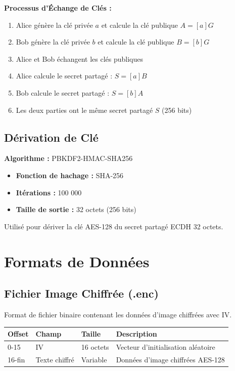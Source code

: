 \documentclass[12pt,a4paper]{report}
\begin{document}
\textbf{Processus d'Échange de Clés :}
\begin{enumerate}
    \item Alice génère la clé privée $a$ et calcule la clé publique $A = [a]G$
    \item Bob génère la clé privée $b$ et calcule la clé publique $B = [b]G$
    \item Alice et Bob échangent les clés publiques
    \item Alice calcule le secret partagé : $S = [a]B$
    \item Bob calcule le secret partagé : $S = [b]A$
    \item Les deux parties ont le même secret partagé $S$ (256 bits)
\end{enumerate}

\subsection{Dérivation de Clé}

\textbf{Algorithme :} PBKDF2-HMAC-SHA256

\begin{itemize}
    \item \textbf{Fonction de hachage :} SHA-256
    \item \textbf{Itérations :} 100 000
    \item \textbf{Taille de sortie :} 32 octets (256 bits)
\end{itemize}

Utilisé pour dériver la clé AES-128 du secret partagé ECDH 32 octets.

\section{Formats de Données}

\subsection{Fichier Image Chiffrée (.enc)}

Format de fichier binaire contenant les données d'image chiffrées avec IV.

\begin{table}[H]
    \centering
    \begin{tabular}{|l|l|l|l|}
    \hline
    \textbf{Offset} & \textbf{Champ} & \textbf{Taille} & \textbf{Description} \\
    \hline
    0-15 & IV & 16 octets & Vecteur d'initialisation aléatoire \\
    16-fin & Texte chiffré & Variable & Données d'image chiffrées AES-128 \\
    \hline
    \end{tabular}
\end{table}
\end{document}
